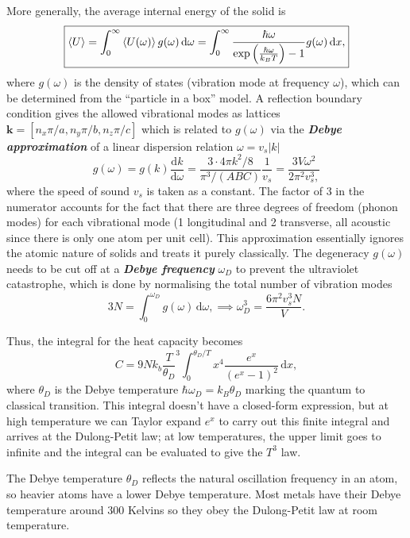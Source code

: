\documentclass{article}
\theoremstyle{nonumberplain}
\begin{document}
More generally, the average internal energy of the solid is
\begin{equation*}
    \boxed{
        \expval{U} = \int_{0}^{\infty} \expval{U(\omega )}g(\omega ) \,\mathrm{d}\omega = 
        \int_{0}^{\infty} \frac{\hbar \omega }{\exp \left( \frac{\hbar \omega }{k_B T} \right) - 1}g(\omega )  \,\mathrm{d}x , 
    }
\end{equation*}
where $g(\omega )$ is the density of states (vibration mode at frequency $\omega$), which can be determined from the ``particle in a box'' model. A reflection boundary condition gives the allowed vibrational modes as lattices $\mathbf{k} = [n_x \pi / a, n_y \pi / b, n_z \pi /c]$ which is related to $g(\omega)$ via the \textit{\textbf{Debye approximation}} of a linear dispersion relation $\omega = v_s \left\vert k \right\vert$
\[
    g(\omega ) = g(k) \frac{\mathrm{d}k}{\mathrm{d}\omega } = 
    \frac{3 \cdot 4 \pi k^{2} / 8 }{\pi ^3 / (ABC)} \frac{1}{v_s} = 
    \frac{3V \omega ^{2} }{2 \pi  ^{2} v_s^3,}
\]
where the speed of sound $v_s$ is taken as a constant. The factor of $3$ in the numerator accounts for the fact that there are three degrees of freedom (phonon modes) for each vibrational mode (1 longitudinal and 2 transverse, all acoustic since there is only one atom per unit cell). This approximation essentially ignores the atomic nature of solids and treats it purely classically. The degeneracy $g(\omega)$ needs to be cut off at a \textit{\textbf{Debye frequency}} $\omega_D$ to prevent the ultraviolet catastrophe, which is done by normalising the total number of vibration modes
\[
    3N = \int_{0}^{\omega_D} g(\omega ) \,\mathrm{d}\omega , \implies  \omega_D^3 = \frac{6\pi ^{2} v_s^3 N}{V}.  
\] 

Thus, the integral for the heat capacity becomes 
\[
    C = 9 N k_b \frac{T}{\theta_D}^3 \int_{0}^{\theta_D / T} x^4 \frac{e^x}{(e^x - 1)^{2} } \,\mathrm{d}x,
\]
where $\theta_D$ is the Debye temperature $\hbar \omega_D = k_B \theta_D$ marking the quantum to classical transition. This integral doesn't have a closed-form expression, but at high temperature we can Taylor expand $e^x$ to carry out this finite integral and arrives at the Dulong-Petit law; at low temperatures, the upper limit goes to infinite and the integral can be evaluated to give the $T^3$ law. 

The Debye temperature $\theta_D$ reflects the natural oscillation frequency in an atom, so heavier atoms have a lower Debye temperature. Most metals have their Debye temperature around $300$ Kelvins so they obey the Dulong-Petit law at room temperature. 
\end{document}
